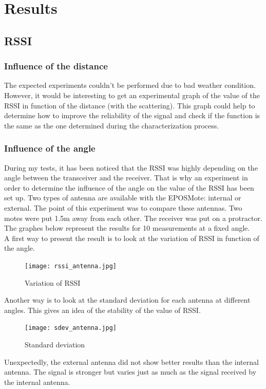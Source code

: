 \documentclass[a4paper,10pt]{article}
\begin{document}
\section{Results}
\subsection{RSSI}	
\subsubsection{Influence of the distance}
The expected experiments couldn't be performed due to bad weather condition. However, it would be interesting to get an experimental graph of
the value of the RSSI in function of the distance (with the scattering). This graph could help to determine how to improve the reliability of
the signal and check if the function is the same as the one determined during the characterization process.
\subsubsection{Influence of the angle}
During my tests, it has been noticed that the RSSI was highly depending on the angle between the transceiver and the receiver. That is why an
experiment in order to determine the influence of the angle on the value of the RSSI has been set up. Two types of antenna are available with the
EPOSMote: internal or external. The point of this experiment was to compare these antennas. 
Two motes were put 1.5m away from each other. The receiver was put on a protractor. The graphes below represent the results for 10
measurements at a fixed angle.\\
A first way to present the result is to look at the variation of RSSI in function of the angle.
\begin{figure}[H]
  \centering
 \texttt{[image: rssi\_antenna.jpg]}
  \caption{Variation of RSSI}
\end{figure}
\noindent
Another way is to look at the standard deviation for each antenna at different angles. This gives an idea of the stability of the value of RSSI.
\begin{figure}[H]
  \centering
 \texttt{[image: sdev\_antenna.jpg]}
  \caption{Standard deviation}
\end{figure}
\noindent
Unexpectedly, the external antenna did not show better results than the internal antenna. The signal is stronger but varies just as much as the
signal received by the internal antenna.
\end{document}

